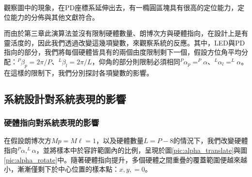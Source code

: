 觀察圖中的現象，在PD座標系延伸出去，有一橢圓區塊具有很高的定位能力，定位能力的分佈與其他文獻符合。

而由於第三章此演算法並沒有限制硬體數量、朗博次方與硬體指向，在設計上是有靈活度的，因此我們透過改變這幾項變數，來觀察系統的反應。其中，LED與PD指向的部分，我們將每個硬體皆具有的兩個由度限制剩下一個，假設方位角平均分配：$^P\beta_p = 2\pi/P$、$^L\beta_l = 2\pi/L$，仰角的部分則限制必須相同$^P\alpha_p =^P\alpha$、$^L\alpha_l = ^L\alpha$。在這樣的限制下，我們分別探討各項變數的影響。



\subsection{系統設計對系統表現的影響}
\label{chp:design_result}

\subsubsection{硬體指向對系統表現的影響}
\label{chp:orient_effect}

在假設朗博次方$Mp=M\ell=1$，以及硬體數量$L=P-8$的情況下，我們改變硬體指向$^P\alpha,^L\alpha$，並將樣本中於容許範圍內的比例，呈現於圖\ref{pic:alpha_translate}與圖\ref{pic:alpha_rotate}中。隨著硬體指向提升，多個硬體之間重疊的覆蓋範圍便越來越小，漸漸僅剩下於中心位置的樣本點：$x,y,=0$。

